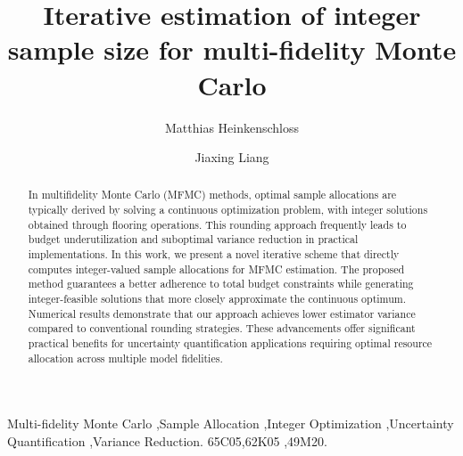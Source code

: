 \documentclass[final,3p,times,11pt]{elsarticle}
\begin{document}
\begin{frontmatter}
\title{Iterative estimation of integer sample size for multi-fidelity Monte Carlo}



\author[MH]{Matthias Heinkenschloss}
\address[MH]{Department of Computational Applied Mathematics \& Operations Research and The Ken Kennedy Institute, Rice  University.}
\author[JL]{Jiaxing Liang}
\address[JL]{Department of Computational Applied Mathematics \& Operations Research, Rice University.}

\begin{abstract}
In multifidelity Monte Carlo (MFMC) methods, optimal sample allocations are typically derived by solving a continuous optimization problem, with integer solutions obtained through flooring operations. This rounding approach frequently leads to budget underutilization and suboptimal variance reduction in practical implementations. In this work, we present a novel iterative scheme that directly computes integer-valued sample allocations for MFMC estimation. The proposed method guarantees a better adherence to total budget constraints while generating integer-feasible solutions that more closely approximate the continuous optimum. Numerical results demonstrate that our approach achieves lower estimator variance compared to conventional rounding strategies. These advancements offer significant practical benefits for uncertainty quantification applications requiring optimal resource allocation across multiple model fidelities.
\end{abstract}





\begin{keyword}
Multi-fidelity Monte Carlo \sep Sample Allocation \sep Integer Optimization  \sep Uncertainty Quantification \sep Variance Reduction.
%
\MSC[2020] 65C05\sep 62K05 \sep 49M20.
\end{keyword}
\end{frontmatter}

 
 



 
 



% 

% 
\end{document}

